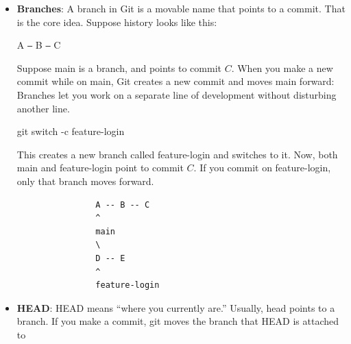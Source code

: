 \documentclass{report}
\begin{document}
\begin{itemize}
\begin{itemize}
                    \bigbreak \noindent 
                    Use it when the bad commit is already part of shared history, such as a branch you pushed to GitHub.
                    \bigbreak \noindent 
                    If commit \textbf{abc123} adds a line "\textit{hello}", then
                    \bigbreak \noindent 
                    \begin{bashcode}
                        git revert abc123
                    \end{bashcode}
                    \bigbreak \noindent 
                    creates a new commit that removes that line. The original commit still exists in history.
                \item \textbf{Reset}: git reset moves the current branch pointer to another commit. Depending on the option, it may also change the staging area and working tree.
                    \bigbreak \noindent 
                    Use it when you want to move your branch backward or rewrite local history.
            \end{itemize}
        \item \textbf{Branches}: A branch in Git is a movable name that points to a commit. That is the core idea. Suppose history looks like this:
            \begin{center}
                A \texttt{--} B \texttt{--} C 
            \end{center}
            Suppose main is a branch, and points to commit $C$. When you make a new commit while on main, Git creates a new commit and moves main forward:
            \bigbreak \noindent 
            Branches let you work on a separate line of development without disturbing another line.
            \bigbreak \noindent 
            \begin{bashcode}
                git switch -c feature-login
            \end{bashcode}
            \bigbreak \noindent 
            This creates a new branch called feature-login and switches to it. Now, both main and feature-login point to commit $C$. If you commit on feature-login, only that branch moves forward.
            \begin{verbatim}
                A -- B -- C
                ^
                main
                \
                D -- E
                ^
                feature-login
            \end{verbatim}
        \item \textbf{HEAD}: HEAD means “where you currently are.” Usually, head points to a branch. If you make a commit, git moves the branch that HEAD is attached to 

\end{itemize}
\end{document}
